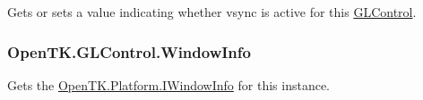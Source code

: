 Gets or sets a value indicating whether vsync is active for this \hyperlink{class_open_t_k_1_1_g_l_control}{G\-L\-Control}. 

\hypertarget{class_open_t_k_1_1_g_l_control_afe6750096b5f441f8a6453dbcfccab9b}{
\subsubsection[{Window\-Info}]{ Open\-T\-K.\-G\-L\-Control.\-Window\-Info\hspace{0.3cm}{\ttfamily [get]}}}\label{class_open_t_k_1_1_g_l_control_afe6750096b5f441f8a6453dbcfccab9b}


Gets the \hyperlink{interface_open_t_k_1_1_platform_1_1_i_window_info}{Open\-T\-K.\-Platform.\-I\-Window\-Info} for this instance. 

